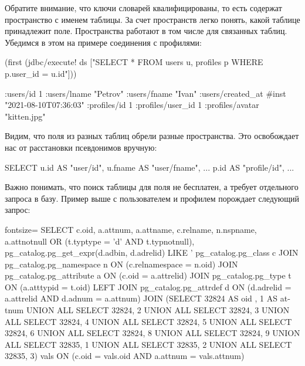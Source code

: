 Обратите внимание, что ключи словарей квалифицированы, то есть содержат пространство с именем таблицы. За счет пространств легко понять, какой таблице принадлежит поле. Пространства работают в том числе для связанных таблиц. Убедимся в этом на примере соединения с профилями:

\begin{english}
  \begin{clojure}
(first
  (jdbc/execute! ds
    ["SELECT *
      FROM users u, profiles p
      WHERE p.user_id = u.id"]))

{:users/id 1
 :users/lname "Petrov"
 :users/fname "Ivan"
 :users/created_at #inst "2021-08-10T07:36:03"
 :profiles/id 1
 :profiles/user_id 1
 :profiles/avatar "kitten.jpg"}
  \end{clojure}
\end{english}

Видим, что поля из разных таблиц обрели разные пространства. Это освобождает нас от расстановки псевдонимов вручную:

\begin{english}
  \begin{sql}
SELECT
  u.id     AS "user/id",
  u.fname  AS "user/fname",
  ...
  p.id     AS "profile/id",
  ...
  \end{sql}
\end{english}

Важно понимать, что поиск таблицы для поля не бесплатен, а требует отдельного запроса в базу. Пример выше с пользователем и профилем порождает следующий запрос:

\begin{english}
  \begin{sql*}{fontsize=\small}
SELECT c.oid, a.attnum, a.attname, c.relname, n.nspname,
a.attnotnull OR (t.typtype = 'd' AND t.typnotnull),
pg_catalog.pg_get_expr(d.adbin, d.adrelid) LIKE '%
pg_catalog.pg_class c JOIN pg_catalog.pg_namespace n
ON (c.relnamespace = n.oid) JOIN pg_catalog.pg_attribute a
ON (c.oid = a.attrelid) JOIN pg_catalog.pg_type t ON (a.atttypid
= t.oid) LEFT JOIN pg_catalog.pg_attrdef d ON (d.adrelid =
a.attrelid AND d.adnum = a.attnum) JOIN (SELECT 32824 AS oid , 1
AS attnum UNION ALL SELECT 32824, 2 UNION ALL SELECT 32824, 3
UNION ALL SELECT 32824, 4 UNION ALL SELECT 32824, 5 UNION ALL
SELECT 32824, 6 UNION ALL SELECT 32824, 8 UNION ALL SELECT 32824,
9 UNION ALL SELECT 32835, 1 UNION ALL SELECT 32835, 2 UNION ALL
SELECT 32835, 3) vals ON (c.oid = vals.oid AND a.attnum =
vals.attnum)
  \end{sql*}
\end{english}

